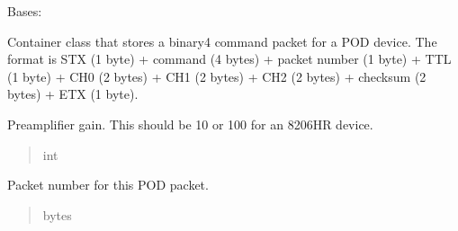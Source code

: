 \documentclass[letterpaper,10pt,english]{sphinxmanual}
\begin{document}
\begin{fulllineitems}
\label{\detokenize{Morelia.Packets:Morelia.Packets.Binary4.PacketBinary4}}
\pysigstartsignatures
{}
\pysigstopsignatures
\sphinxAtStartPar
Bases: {\hyperref[\detokenize{Morelia.Packets:Morelia.Packets.Packet.Packet}]{}}

\sphinxAtStartPar
Container class that stores a binary4 command packet for a POD device. The format is     STX (1 byte) + command (4 bytes) + packet number (1 byte) + TTL (1 byte) +     CH0 (2 bytes) + CH1 (2 bytes) + CH2 (2 bytes) + checksum (2 bytes) + ETX (1 byte).

\begin{fulllineitems}
\label{\detokenize{Morelia.Packets:Morelia.Packets.Binary4.PacketBinary4._preampGain}}
\pysigstartsignatures
{}
\pysigstopsignatures
\sphinxAtStartPar
Preamplifier gain. This should be 10 or 100 for an 8206\sphinxhyphen{}HR device.
\begin{quote}\begin{description}
\sphinxAtStartPar
int

\end{description}\end{quote}

\end{fulllineitems}


\begin{fulllineitems}
\label{\detokenize{Morelia.Packets:Morelia.Packets.Binary4.PacketBinary4.packetNumber}}
\pysigstartsignatures
{}
\pysigstopsignatures
\sphinxAtStartPar
Packet number for this POD packet.
\begin{quote}\begin{description}
\sphinxAtStartPar
bytes


\end{description}
\end{quote}
\end{fulllineitems}
\end{fulllineitems}
\end{document}
